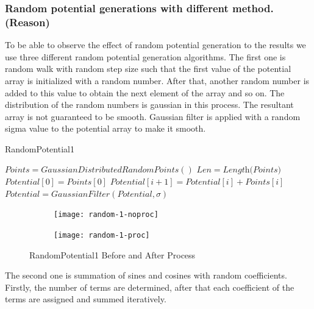 \documentclass[a4paper,times,12pt]{article}
\begin{document}
\subsubsection{Random potential generations with different method. (Reason)}
\label{sec:random_potential_gen}

To be able to observe the effect of random potential generation to the results we use three different random potential generation algorithms. The first one is random walk with random step size such that the first value of the potential array is initialized with a random number. After that, another random number is added to this value to obtain the next element of the array and so on. The distribution of the random numbers is gaussian in this process. The resultant array is not guaranteed to be smooth. Gaussian filter is applied with a random sigma value to the potential array to make it smooth.    

\begin{algorithm}[H]
    \caption{RandomPotential1}\label{euclid}
    \begin{algorithmic}[1]
        \State $ Points = GaussianDistributedRandomPoints()$
        \State $Len = \textit{Length(Points)}$
        \State $Potential[0] = Points[0]$
        \State $Potential[i + 1] = Potential[i] + Points[i]$
        \EndFor
        \State $Potential = GaussianFilter(Potential, \sigma)$ 
    \EndProcedure
    \end{algorithmic}
\label{alg:random_potential_1}
\end{algorithm}

\graphicspath{{"../figs/potentials/"}}
\begin{figure}[H]
    \centering
    \begin{subfigure}[t]{0.45\textwidth}
        \texttt{[image: random-1-noproc]}
		
    \end{subfigure}
    \begin{subfigure}[t]{0.45\textwidth}
        \texttt{[image: random-1-proc]}
		
    \end{subfigure}
\caption{RandomPotential1 Before and After Process}
\label{fig:random1_before_after}
\end{figure}



The second one is summation of sines and cosines with random coefficients. Firstly, the number of terms are determined, after that each coefficient of the terms are assigned and summed iteratively.
\end{document}
